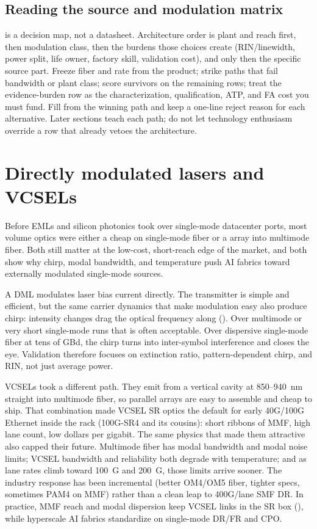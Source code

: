 \subsection{Reading the source and modulation matrix}
\label{sec:source-mod-matrix-read}

 is a decision map, not a datasheet. Architecture
order is plant and reach first, then modulation class, then the burdens those
choices create (RIN/linewidth, power split, life owner, factory skill,
validation cost), and only then the specific source part. Freeze fiber and
rate from the product; strike paths that fail bandwidth or plant class; score
survivors on the remaining rows; treat the evidence-burden row as the
characterization, qualification, ATP, and FA cost you must fund. Fill
 from the winning path and keep a one-line reject reason for
each alternative. Later sections teach each path; do not let technology
enthusiasm override a row that already vetoes the architecture.

\section{Directly modulated lasers and VCSELs}
\label{sec:dml-vcsel}

Before EMLs and silicon photonics took over single-mode datacenter ports, most
volume optics were either a cheap  on single-mode fiber or a
 array into multimode fiber. Both still matter at the low-cost,
short-reach edge of the market, and both show why chirp, modal bandwidth, and
temperature push AI fabrics toward externally modulated single-mode sources.

A DML modulates laser bias current directly. The transmitter is simple and
efficient, but the same carrier dynamics that make modulation easy also produce
chirp: intensity changes drag the optical frequency along
(). Over multimode or very short single-mode runs that
is often acceptable. Over dispersive single-mode fiber at tens of GBd, the chirp
turns into inter-symbol interference and closes the eye. Validation therefore
focuses on extinction ratio, pattern-dependent chirp, and RIN, not just average
power.

VCSELs took a different path. They emit from a vertical cavity at 850--940~nm
straight into multimode fiber, so parallel arrays are easy to assemble and cheap
to ship. That combination made VCSEL SR optics the default for early 40G/100G
Ethernet inside the rack (100G-SR4 and its cousins): short ribbons of MMF, high
lane count, low dollars per gigabit. The same physics that made them attractive
also capped their future. Multimode fiber has modal bandwidth and modal noise
limits; VCSEL bandwidth and reliability both degrade with temperature; and as
lane rates climb toward 100~G and 200~G, those limits arrive sooner. The industry
response has been incremental (better OM4/OM5 fiber, tighter specs, sometimes
PAM4 on MMF) rather than a clean leap to 400G/lane SMF DR. In practice, MMF
reach and modal dispersion keep VCSEL links in the SR box
(), while hyperscale AI fabrics standardize on single-mode
DR/FR and CPO.

